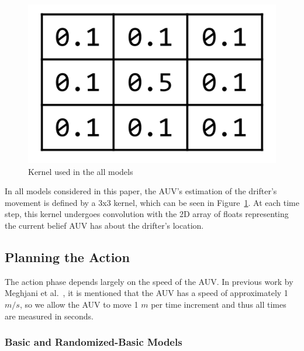 \documentclass[a4paper, 11pt]{article} %
\begin{document}
\begin{figure}
	\vspace{-40pt}
	\begin{center}
		\includegraphics[scale=0.30]{Basic_Kernel.png}
		\vspace{-20pt}
	\end{center}
\caption{Kernel used in the all models \label{basicKernel}}
\vspace{-10pt}
\end{figure}

In all models considered in this paper, the AUV's estimation of the drifter's movement is defined by a 3x3 kernel, which can be seen in Figure~\ref{basicKernel}. At each time step, this kernel undergoes convolution with the 2D array of floats representing the current belief AUV has about the drifter's location.

\subsection*{Planning the Action}

The action phase depends largely on the speed of the AUV. In previous work by Meghjani et al.~\cite{meghjani14}, it is mentioned that the AUV has a speed of approximately 1 $m/s$, so we allow the AUV to move 1 $m$ per time increment and thus all times are measured in seconds. 

\subsubsection*{Basic and Randomized-Basic Models}
\end{document}

